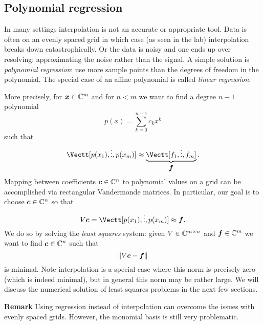 \subsection{Polynomial regression}
In many settings interpolation is not an accurate or appropriate tool. Data is often on an evenly spaced grid in which case (as seen in the lab) interpolation breaks down catastrophically. Or the data is noisy and one ends up over resolving: approximating the noise rather than the signal. A simple solution is \emph{polynomial regression}: use more sample points  than the degrees of freedom in the polynomial. The special case of an affine polynomial is called \emph{linear regression}.

More precisely, for $\bm{{\mbox{\boldmath$x$\unboldmath}}} \in {\mathbb C}^m$ and for $n < m$ we want to find a degree $n-1$ polynomial
\[
p(x) = \ensuremath{\sum}_{k=0}^{n-1} c_k x^k
\]
such that
\[
\Vectt[p(x_1), \ensuremath{\vdots}, p(x_m)] \ensuremath{\approx} \underbrace{\Vectt[f_1,\ensuremath{\vdots},f_m]}_{\ensuremath{\bm{\f}}}.
\]
Mapping between coefficients $\bm{{\mbox{\boldmath$c$\unboldmath}}} \in {\mathbb C}^n$ to polynomial values on a grid can be accomplished  via rectangular Vandermonde matrices. In particular, our goal is to choose $\bm{{\mbox{\boldmath$c$\unboldmath}}} \in {\mathbb C}^n$ so that
\[
V \ensuremath{\bm{\c}}  = \Vectt[p(x_1), \ensuremath{\vdots}, p(x_m)] \ensuremath{\approx} \ensuremath{\bm{\f}}.
\]
We do so by solving the \emph{least squares} system: given $V \in {\mathbb C}^{m \times n}$ and $\bm{{\mbox{\boldmath$f$\unboldmath}}} \in {\mathbb C}^m$ we want to find $\bm{{\mbox{\boldmath$c$\unboldmath}}} \in {\mathbb C}^n$ such that
\[
\| V \bm{{\mbox{\boldmath$c$\unboldmath}}} - \bm{{\mbox{\boldmath$f$\unboldmath}}} \|
\]
is minimal. Note interpolation is a special case where this norm is precisely zero (which is indeed minimal), but in general this norm may be rather large.   We will discuss the numerical solution of least squares problems in the next few sections.

\textbf{Remark} Using regression instead of interpolation can overcome the issues with evenly spaced grids. However, the monomial basis is still very problematic.



